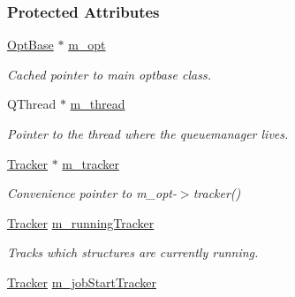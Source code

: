 \subsubsection*{Protected Attributes}
\begin{DoxyCompactItemize}
\item 
\hypertarget{classGlobalSearch_1_1QueueManager_a73408b74ae38d28709cc86211e569b66}{}\hyperlink{classGlobalSearch_1_1OptBase}{Opt\+Base} $\ast$ \hyperlink{classGlobalSearch_1_1QueueManager_a73408b74ae38d28709cc86211e569b66}{m\+\_\+opt}\label{classGlobalSearch_1_1QueueManager_a73408b74ae38d28709cc86211e569b66}

\begin{DoxyCompactList}\small\item\em Cached pointer to main optbase class. \end{DoxyCompactList}\item 
\hypertarget{classGlobalSearch_1_1QueueManager_aad3c44dad7c196ee965cdf4e1c66322c}{}Q\+Thread $\ast$ \hyperlink{classGlobalSearch_1_1QueueManager_aad3c44dad7c196ee965cdf4e1c66322c}{m\+\_\+thread}\label{classGlobalSearch_1_1QueueManager_aad3c44dad7c196ee965cdf4e1c66322c}

\begin{DoxyCompactList}\small\item\em Pointer to the thread where the queuemanager lives. \end{DoxyCompactList}\item 
\hypertarget{classGlobalSearch_1_1QueueManager_ab41f6210551ab04ed0518cd4f40d8e0d}{}\hyperlink{classGlobalSearch_1_1Tracker}{Tracker} $\ast$ \hyperlink{classGlobalSearch_1_1QueueManager_ab41f6210551ab04ed0518cd4f40d8e0d}{m\+\_\+tracker}\label{classGlobalSearch_1_1QueueManager_ab41f6210551ab04ed0518cd4f40d8e0d}

\begin{DoxyCompactList}\small\item\em Convenience pointer to m\+\_\+opt-\/$>$tracker() \end{DoxyCompactList}\item 
\hypertarget{classGlobalSearch_1_1QueueManager_af081fe2ea7f98693ae5a4cbc4246a812}{}\hyperlink{classGlobalSearch_1_1Tracker}{Tracker} \hyperlink{classGlobalSearch_1_1QueueManager_af081fe2ea7f98693ae5a4cbc4246a812}{m\+\_\+running\+Tracker}\label{classGlobalSearch_1_1QueueManager_af081fe2ea7f98693ae5a4cbc4246a812}

\begin{DoxyCompactList}\small\item\em Tracks which structures are currently running. \end{DoxyCompactList}\item 
\hypertarget{classGlobalSearch_1_1QueueManager_a1d9b17d2b9a12f6641282b9bab327046}{}\hyperlink{classGlobalSearch_1_1Tracker}{Tracker} \hyperlink{classGlobalSearch_1_1QueueManager_a1d9b17d2b9a12f6641282b9bab327046}{m\+\_\+job\+Start\+Tracker}\label{classGlobalSearch_1_1QueueManager_a1d9b17d2b9a12f6641282b9bab327046}


\end{DoxyCompactItemize}
